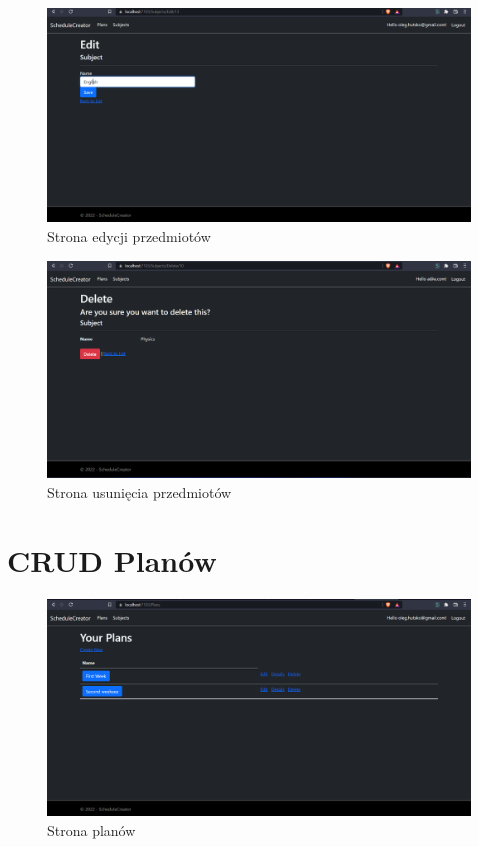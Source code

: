 \documentclass[a4paper,12pt,oneside]{book} %
\begin{document}
\begin{figure}[h]
    \centering\includegraphics[width=14cm]{9.png}
    \caption{Strona edycji przedmiotów}
\end{figure}

\begin{figure}[h]
    \centering\includegraphics[width=14cm]{10.png}
    \caption{Strona usunięcia przedmiotów}
\end{figure}


\chapter*{CRUD Planów}

\begin{figure}[h]
    \centering\includegraphics[width=14cm]{16.png}
    \caption{Strona planów }
\end{figure}
\end{document}
